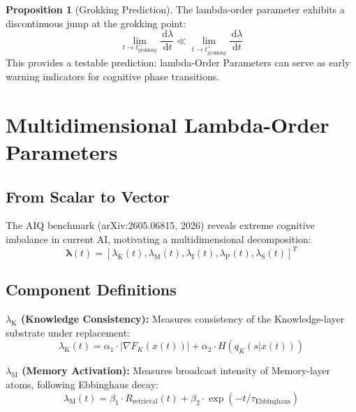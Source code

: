 \documentclass[11pt,a4paper]{article}
\theoremstyle{definition}
\newtheorem{proposition}{Proposition}[section]
\theoremstyle{remark}
\newcommand{\lambdaK}{\lambda_{\text{K}}}
\newcommand{\lambdaM}{\lambda_{\text{M}}}
\newcommand{\lambdaI}{\lambda_{\text{I}}}
\newcommand{\lambdaP}{\lambda_{\text{P}}}
\newcommand{\lambdaS}{\lambda_{\text{S}}}
\newcommand{\lambdavec}{\boldsymbol{\lambda}}
\newcommand{\diff}{\,\mathrm{d}}
\begin{document}
\begin{proposition}[Grokking Prediction]\label{prop:grokking}
The lambda-order parameter exhibits a discontinuous jump at the grokking point:
\begin{equation}
\lim_{t \rightarrow t_{\text{grokking}}^-} \frac{\diff\lambda}{\diff t} \ll \lim_{t \rightarrow t_{\text{grokking}}^+} \frac{\diff\lambda}{\diff t}
\end{equation}
This provides a testable prediction: lambda-Order Parameters can serve as early warning indicators for cognitive phase transitions.
\end{proposition}

\section{Multidimensional Lambda-Order Parameters}\label{sec:lambda}

\subsection{From Scalar to Vector}\label{subsec:scalar-to-vector}

The AIQ benchmark (arXiv:2605.06815, 2026) reveals extreme cognitive imbalance in current AI, motivating a multidimensional decomposition:
\begin{equation}
\lambdavec(t) = [\lambdaK(t), \lambdaM(t), \lambdaI(t), \lambdaP(t), \lambdaS(t)]^T
\end{equation}

\subsection{Component Definitions}\label{subsec:lambda-components}

\textbf{$\lambdaK$ (Knowledge Consistency):} Measures consistency of the Knowledge-layer substrate under replacement:
\begin{equation}
\lambdaK(t) = \alpha_1 \cdot |\nabla F_K(x(t))| + \alpha_2 \cdot H(q_K(s|x(t)))
\end{equation}

\textbf{$\lambdaM$ (Memory Activation):} Measures broadcast intensity of Memory-layer atoms, following Ebbinghaus decay:
\begin{equation}
\lambdaM(t) = \beta_1 \cdot R_{\text{retrieval}}(t) + \beta_2 \cdot \exp(-t/\tau_{\text{Ebbinghaus}})
\end{equation}
\end{document}
